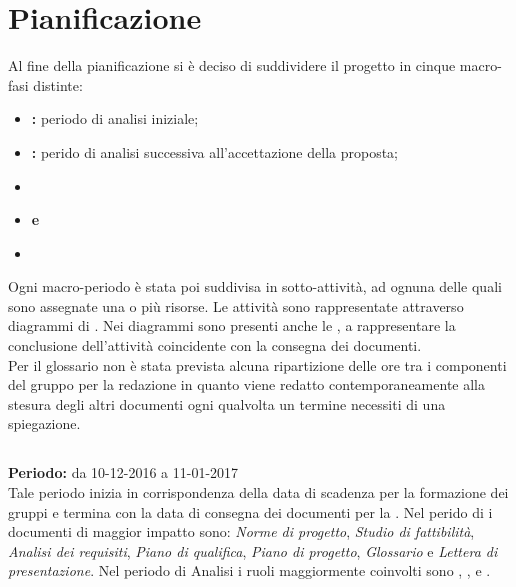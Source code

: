\section{Pianificazione}

Al fine della pianificazione si è deciso di suddividere il progetto in cinque macro-fasi distinte:
\begin{itemize}
\item \textbf{\AR{}:} periodo di analisi iniziale;
\item \textbf{\AD{}:} perido di analisi successiva all'accettazione della proposta;
\item \textbf{\PA{}}
\item \textbf{\PD{} e \Cod{}}
\item \textbf{\VV{}}
\end{itemize}
Ogni macro-periodo è stata poi suddivisa in sotto-attività, ad ognuna delle quali sono assegnate una o più risorse. Le attività sono rappresentate attraverso diagrammi di . Nei diagrammi sono presenti anche le , a rappresentare la conclusione dell'attività coincidente con la consegna dei documenti. \\
Per il glossario non è stata prevista alcuna ripartizione delle ore tra i componenti del gruppo per la redazione in quanto viene redatto contemporaneamente alla stesura degli altri documenti ogni qualvolta un termine necessiti di una spiegazione.

\subsection{\AR{}}
\textbf{Periodo:} da 10-12-2016 a 11-01-2017 \\
Tale periodo inizia in corrispondenza della data di scadenza per la formazione dei gruppi e termina con la data di consegna dei documenti per la \RR{}. Nel perido di \AR{} i documenti di maggior impatto sono: \textit{Norme di progetto}, \textit{Studio di fattibilità}, \textit{Analisi dei requisiti}, \textit{Piano di qualifica}, \textit{Piano di progetto}, \textit{Glossario} e \textit{Lettera di presentazione}.
Nel periodo di Analisi i ruoli maggiormente coinvolti sono \Analista{}, \Responsabile{}, \Amministratore{} e \Verificatore{}.

